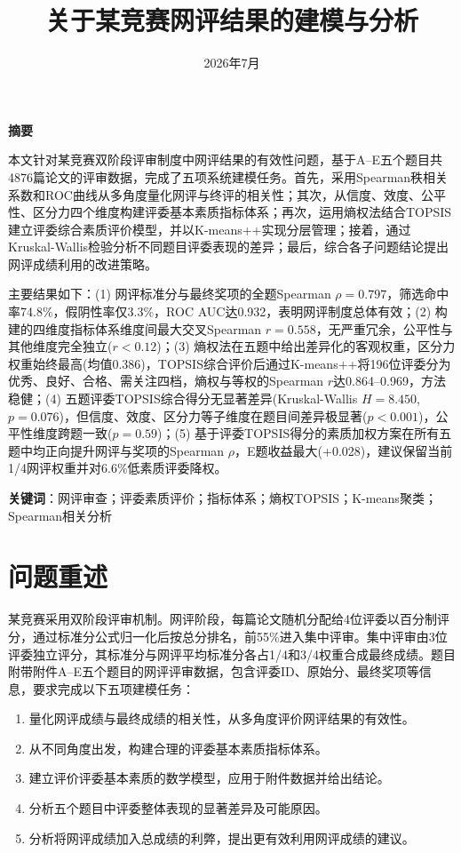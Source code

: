 \documentclass[UTF8,12pt]{ctexart}
\title{\textbf{关于某竞赛网评结果的建模与分析}}
\author{}
\date{2026年7月}
\begin{document}
\maketitle

\begin{center}
\Large\textbf{摘\quad 要}
\end{center}

本文针对某竞赛双阶段评审制度中网评结果的有效性问题，基于A--E五个题目共4876篇论文的评审数据，完成了五项系统建模任务。首先，采用Spearman秩相关系数和ROC曲线从多角度量化网评与终评的相关性；其次，从信度、效度、公平性、区分力四个维度构建评委基本素质指标体系；再次，运用熵权法结合TOPSIS建立评委综合素质评价模型，并以K-means++实现分层管理；接着，通过Kruskal-Wallis检验分析不同题目评委表现的差异；最后，综合各子问题结论提出网评成绩利用的改进策略。

主要结果如下：(1) 网评标准分与最终奖项的全题Spearman $\rho = 0.797$，筛选命中率74.8\%，假阴性率仅3.3\%，ROC AUC达0.932，表明网评制度总体有效；(2) 构建的四维度指标体系维度间最大交叉Spearman $r = 0.558$，无严重冗余，公平性与其他维度完全独立($r < 0.12$)；(3) 熵权法在五题中给出差异化的客观权重，区分力权重始终最高(均值0.386)，TOPSIS综合评价后通过K-means++将196位评委分为优秀、良好、合格、需关注四档，熵权与等权的Spearman $r$达0.864--0.969，方法稳健；(4) 五题评委TOPSIS综合得分无显著差异(Kruskal-Wallis $H = 8.450$, $p = 0.076$)，但信度、效度、区分力等子维度在题目间差异极显著($p < 0.001$)，公平性维度跨题一致($p = 0.59$)；(5) 基于评委TOPSIS得分的素质加权方案在所有五题中均正向提升网评与奖项的Spearman $\rho$，E题收益最大(+0.028)，建议保留当前1/4网评权重并对6.6\%低素质评委降权。

\vspace{1em}
\noindent\textbf{关键词}：网评审查；评委素质评价；指标体系；熵权TOPSIS；K-means聚类；Spearman相关分析

\newpage

\section{问题重述}

某竞赛采用双阶段评审机制。网评阶段，每篇论文随机分配给4位评委以百分制评分，通过标准分公式归一化后按总分排名，前55\%进入集中评审。集中评审由3位评委独立评分，其标准分与网评平均标准分各占1/4和3/4权重合成最终成绩。题目附带附件A--E五个题目的网评评审数据，包含评委ID、原始分、最终奖项等信息，要求完成以下五项建模任务：

\begin{enumerate}[label=(\arabic*)]
    \item 量化网评成绩与最终成绩的相关性，从多角度评价网评结果的有效性。
    \item 从不同角度出发，构建合理的评委基本素质指标体系。
    \item 建立评价评委基本素质的数学模型，应用于附件数据并给出结论。
    \item 分析五个题目中评委整体表现的显著差异及可能原因。
    \item 分析将网评成绩加入总成绩的利弊，提出更有效利用网评成绩的建议。
\end{enumerate}
\end{document}
